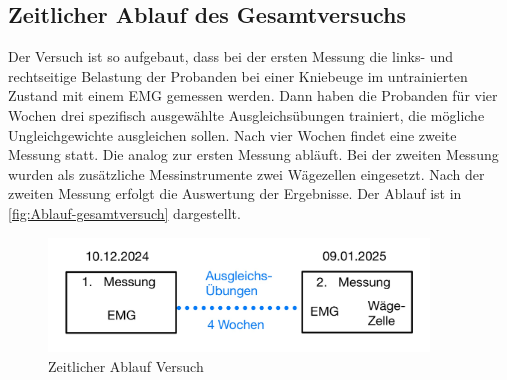 \subsection{Zeitlicher Ablauf des Gesamtversuchs}
Der Versuch ist so aufgebaut, dass bei der ersten Messung die links- und rechtseitige Belastung der Probanden bei einer Kniebeuge im untrainierten Zustand mit einem EMG gemessen werden.
Dann haben die Probanden für vier Wochen drei spezifisch ausgewählte Ausgleichsübungen trainiert, die mögliche Ungleichgewichte ausgleichen sollen.
Nach vier Wochen findet eine zweite Messung statt. Die analog zur ersten Messung abläuft. Bei der zweiten Messung wurden als zusätzliche Messinstrumente zwei Wägezellen eingesetzt.
Nach der zweiten Messung erfolgt die Auswertung der Ergebnisse.
Der Ablauf ist in \autoref{fig:Ablauf-gesamtversuch} dargestellt.
\begin{figure}[h!]
    \centering
    \includegraphics[width=0.9\textwidth]{img/Ablauf-gesamtversuch.jpg}
    \caption{Zeitlicher Ablauf Versuch}
    \label{fig:Ablauf-gesamtversuch}
\end{figure}
\clearpage
